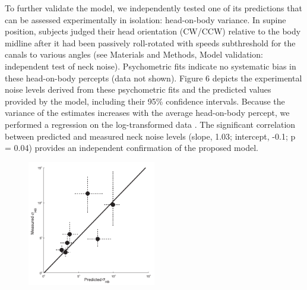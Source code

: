 To further validate the model, we independently tested one of its predictions that can be assessed experimentally in isolation: head-on-body variance. In supine position, subjects judged their head orientation (CW/CCW) relative to the body midline after it had been passively roll-rotated with speeds subthreshold for the canals to various angles (see Materials and Methods, Model validation: independent test of neck noise). Psychometric fits indicate no systematic bias in these head-on-body percepts (data not shown). Figure 6 depicts the experimental noise levels derived from these psychometric fits and the predicted values provided by the model, including their 95\% confidence intervals. Because the variance of the estimates increases with the average head-on-body percept, we performed a regression on the log-transformed data \cite{hopkins2000}. The significant correlation between predicted and measured neck noise levels (slope, 1.03; intercept, -0.1; p = 0.04) provides an independent confirmation of the proposed model. 

\begin{figure}
    \includegraphics[width=0.5\textwidth]{src/paper1/figure6.pdf}
\end{figure}